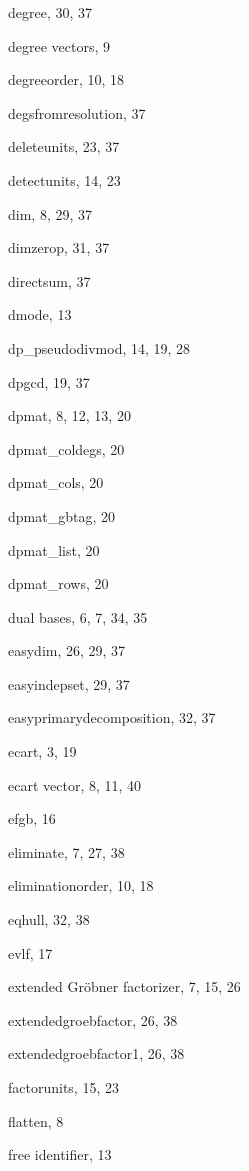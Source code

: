 \documentclass[a4paper,11pt]{article}
\newcommand{\gr}{Gr\"obner}
\begin{document}
\begin{theindex}
  \item degree, 30, 37
  \item degree vectors, 9
  \item degreeorder, 10, 18
  \item degsfromresolution, 37
  \item deleteunits, 23, 37
  \item detectunits, 14, 23
  \item dim, 8, 29, 37
  \item dimzerop, 31, 37
  \item directsum, 37
  \item dmode, 13
  \item dp\_pseudodivmod, 14, 19, 28
  \item dpgcd, 19, 37
  \item dpmat, 8, 12, 13, 20
  \item dpmat\_coldegs, 20
  \item dpmat\_cols, 20
  \item dpmat\_gbtag, 20
  \item dpmat\_list, 20
  \item dpmat\_rows, 20
  \item dual bases, 6, 7, 34, 35

  \indexspace

  \item easydim, 26, 29, 37
  \item easyindepset, 29, 37
  \item easyprimarydecomposition, 32, 37
  \item ecart, 3, 19
  \item ecart vector, 8, 11, 40
  \item efgb, 16
  \item eliminate, 7, 27, 38
  \item eliminationorder, 10, 18
  \item eqhull, 32, 38
  \item evlf, 17
  \item extended {\gr} factorizer, 7, 15, 26
  \item extendedgroebfactor, 26, 38
  \item extendedgroebfactor1, 26, 38

  \indexspace

  \item factorunits, 15, 23
  \item flatten, 8
  \item free identifier, 13

  \indexspace


\end{theindex}
\end{document}
